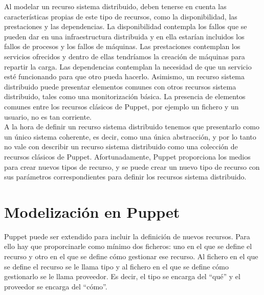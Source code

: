 
Al modelar un recurso sistema distribuido, deben tenerse en cuenta las características propias de este tipo de recursos, como la disponibilidad, las prestaciones y las dependencias. La disponibilidad contempla los fallos que se pueden dar en una infraestructura distribuida y en ella estarían incluidos los fallos de procesos y los fallos de máquinas. Las prestaciones contemplan los servicios ofrecidos y dentro de ellas tendríamos la creación de máquinas para repartir la carga. Las dependencias contemplan la necesidad de que un servicio esté funcionando para que otro pueda hacerlo. Asimismo, un recurso sistema distribuido puede presentar elementos comunes con otros recursos sistema distribuido, tales como una monitorización básica. La presencia de elementos comunes entre los recursos clásicos de Puppet, por ejemplo un fichero y un usuario, no es tan corriente. \\

A la hora de definir un recurso sistema distribuido tenemos que presentarlo como un único sistema coherente, es decir, como una única abstracción, y por lo tanto no vale con describir un recurso sistema distribuido como una colección de recursos clásicos de Puppet. Afortunadamente, Puppet proporciona los medios para crear nuevos tipos de recurso, y se puede crear un nuevo tipo de recurso con sus parámetros correspondientes para definir los recursos sistema distribuido. \\


\section{Modelización en Puppet}
\label{sec:modelado-puppet}

Puppet puede ser extendido para incluir la definición de nuevos recursos. Para ello hay que proporcinarle como mínimo dos ficheros: uno en el que se define el recurso y otro en el que se define cómo gestionar ese recurso. Al fichero en el que se define el recurso se le llama tipo y al fichero en el que se define cómo gestionarlo se le llama proveedor. Es decir, el tipo se encarga del ``qué'' y el proveedor se encarga del ``cómo''.\\

